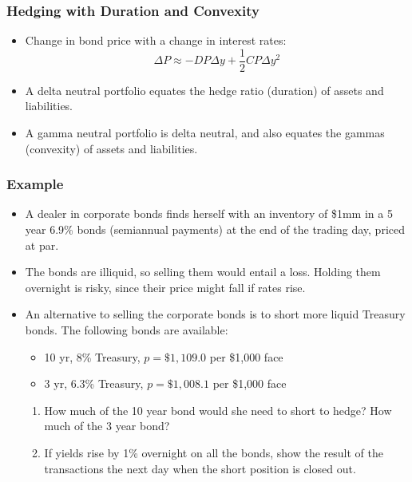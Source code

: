 \documentclass[10pt]{beamer}
\begin{document}
\begin{frame}
	\frametitle{Hedging with Duration and Convexity}
	
	
	\begin{itemize} \itemsep15pt
		\item Change in bond price with a change in
		interest rates:
		$$
		\Delta P \approx -D P \Delta y + \frac{1}{2} C P \Delta y^2 
		$$
		
		\item A delta neutral portfolio equates the hedge ratio (duration) of assets and liabilities.
		
		\item A gamma neutral portfolio is delta neutral, and also
		equates the gammas (convexity) of assets and liabilities.
		
	\end{itemize}
	
\end{frame}



\begin{frame}
	\frametitle{Example}
	
	
	\begin{itemize} \itemsep15pt
		\item A dealer in corporate bonds finds herself with an inventory of \$1mm in a 5 year 6.9\% bonds (semiannual payments) at the end of the trading day, priced at par.
		\item The bonds are illiquid, so selling them would entail a loss. Holding them overnight is risky, since their price might fall if rates rise.
		\item An alternative to selling the corporate bonds is to short more liquid Treasury bonds.  The following bonds are available:
		
		\begin{itemize}
			\item 10 yr, 8\% Treasury, $p = \$1,109.0$ per \$1,000 face
			\item 3 yr, 6.3\% Treasury, $p = \$1,008.1$ per \$1,000 face
		\end{itemize}
		
		\vspace{15pt}
		\begin{enumerate}[a]
			\item How much of the 10 year bond would she need to short to hedge? How much of the 3 year bond?
			\item If yields rise by 1\% overnight on all the bonds, show the result of the transactions the next
			day when the short position is closed out.
		\end{enumerate}
	\end{itemize}
	
\end{frame}
\end{document}

